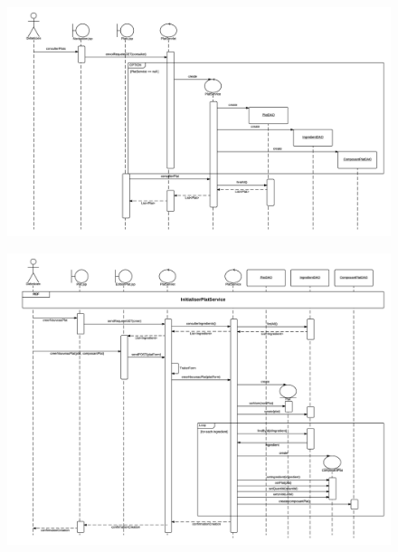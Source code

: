\documentclass{beamer}
\begin{document}
\begin{frame}[plain]{}
\begin{figure}
\centering
\includegraphics[scale=0.325]{../CasDUtilisations/CompositionPlat/sequence_InitialisationPlatControleur.png}
\end{figure}
\end{frame}

\begin{frame}[plain]{}
\begin{figure}
\centering
\includegraphics[scale=0.325]{../CasDUtilisations/CompositionPlat/sequence_CreerPlat.png}
\end{figure}
\end{frame}
\end{document}
